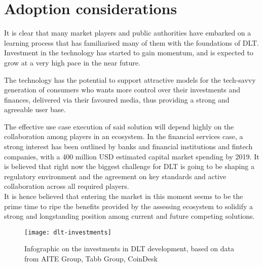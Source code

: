 \section{Adoption considerations}

It is clear that many market players and public authorities have embarked on a learning process that has familiarised many of them with the foundations of DLT. Investment in the technology has started to gain momentum, and is expected to grow at a very high pace in the near future.

The technology has the potential to support attractive models for the tech-savvy generation of consumers who wants more control over their investments and finances, delivered via their favoured media, thus providing a strong and agreeable user base.

The effective use case execution of said solution will depend highly on the collaboration among players in an ecosystem. In the financial services case, a strong interest has been outlined by banks and financial institutions and fintech companies, with a 400 million USD estimated capital market spending by 2019. 
It is believed that right now the biggest challenge for DLT is going to be shaping a regulatory environment and the agreement on key standards and active collaboration across all required players. \\

It is hence believed that entering the market in this moment seems to be the prime time to ripe the benefits provided by the assessing ecosystem to solidify a strong and longstanding position among current and future competing solutions.

\begin{figure}[h]
    \centering
    \texttt{[image: dlt-investments]}
    \caption{
        Infographic on the investments in DLT development,  based on data from AITE Group, Tabb Group, CoinDesk}
\end{figure}